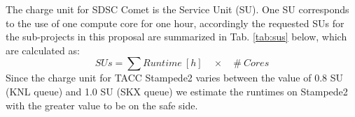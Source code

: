 The charge unit for SDSC Comet is the Service Unit (SU). One SU corresponds to the use of one compute
core for one hour, accordingly the requested SUs for the sub-projects in this proposal are summarized
in Tab. \ref{tab:sus} below, which are calculated as: $$SUs = \sum Runtime~[h]\quad \times\quad \#~Cores$$
Since the charge unit for TACC Stampede2 varies between the value of 0.8 SU (KNL queue) and 1.0 SU (SKX queue) we estimate the runtimes on Stampede2 with the greater value to be on the safe side.

\begin{table}
\caption{Total number of SUs on SDSC Comet for the sub-projects requested}
\label{tab:sus}
\end{table}

